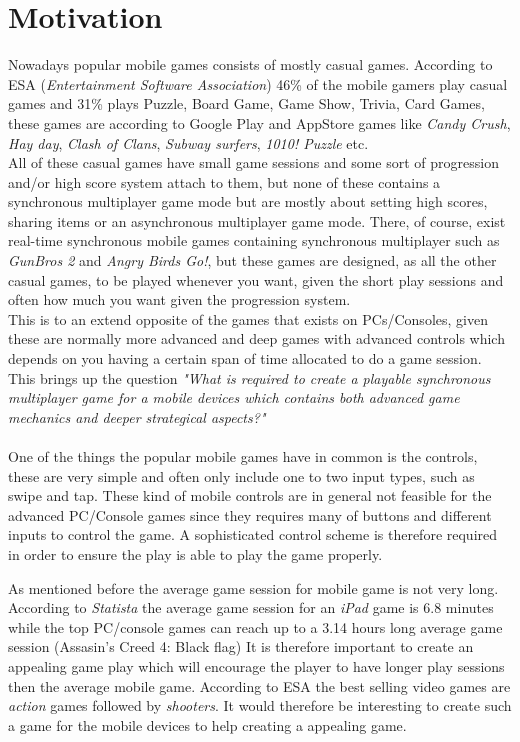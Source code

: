 \section{Motivation} \label{sec:motivation}
Nowadays popular mobile games consists of mostly casual games. According to ESA\cite{ESA}\cite{ESApdf} (\textit{Entertainment Software Association}) 46\% of the mobile gamers play casual games and 31\% plays Puzzle, Board Game, Game Show, Trivia, Card Games, these games are according to Google Play\cite{googleplay} and AppStore\cite{appstore} games like \textit{Candy Crush}, \textit{Hay day}, \textit{Clash of Clans}, \textit{Subway surfers}, \textit{1010! Puzzle} etc.\\
All of these casual games have small game sessions and some sort of progression and/or high score system attach to them, but none of these contains a synchronous multiplayer game mode but are mostly about setting high scores, sharing items or an asynchronous multiplayer game mode.
There, of course, exist real-time synchronous mobile games containing synchronous multiplayer such as \textit{GunBros 2} and \textit{Angry Birds Go!}, but these games are designed, as all the other casual games, to be played whenever you want, given the short play sessions and often how much you want given the progression system.\\
This is to an extend opposite of the games that exists on PCs/Consoles, given these are normally more advanced and deep games with advanced controls which depends on you having a certain span of time allocated to do a game session. 
This brings up the question \textit{"What is required to create a playable synchronous multiplayer game for a mobile devices which contains both advanced game mechanics and deeper strategical aspects?"}\\\\
One of the things the popular mobile games have in common is the controls, these are very simple and often only include one to two input types, such as swipe and tap. These kind of mobile controls are in general not feasible for the advanced PC/Console games since they requires many of buttons and different inputs to control the game. A sophisticated control scheme is therefore required in order to ensure the play is able to play the game properly. 

As mentioned before the average game session for mobile game is not very long. According to \textit{Statista}\cite{statista} the average game session for an \textit{iPad} game is 6.8 minutes\cite{statistaaverageappsession} while the top PC/console games can reach up to a 3.14 hours\cite{statistalongestsession} long average game session (Assasin's Creed 4: Black flag) 
It is therefore important to create an appealing game play which will encourage the player to have longer play sessions then the average mobile game.
According to ESA the best selling video games are \textit{action} games followed by \textit{shooters}. It would therefore be interesting to create such a game for the mobile devices to help creating a appealing game.
